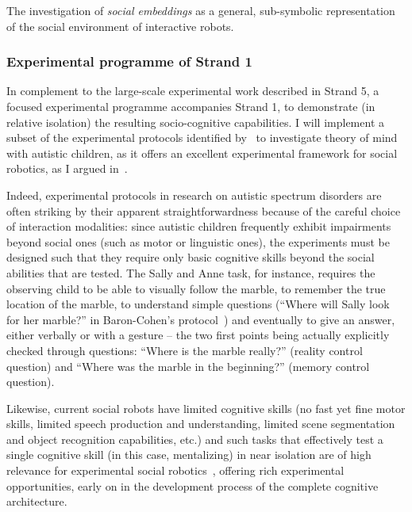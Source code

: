 \begin{outcome}{1.3}
The investigation of \emph{social
    embeddings} as a general, sub-symbolic representation of the social
    environment of interactive robots.
\end{outcome}

\subsubsection{Experimental programme of Strand 1}

In complement to the large-scale experimental work described in Strand 5, a focused experimental programme accompanies Strand 1, to demonstrate (in relative
isolation) the resulting socio-cognitive capabilities. I will implement a subset
of the experimental protocols identified by~\textcite{frith1994autism} to investigate theory of mind with autistic
children, as it offers an excellent experimental framework for social
robotics, as I argued in~\textcite{lemaignan2015mutual}.

Indeed, experimental protocols in research on autistic spectrum disorders are often
striking by their apparent straightforwardness because of the careful choice of
interaction modalities: since autistic children frequently exhibit impairments
beyond social ones (such as motor or linguistic ones), the experiments must be
designed such that they require only basic cognitive skills beyond the social
abilities that are tested. The Sally and Anne task, for instance, requires the
observing child to be able to visually follow the marble, to remember the true
location of the marble, to understand simple questions (``Where will Sally look
for her marble?'' in Baron-Cohen's protocol~\parencite{baron1985does}) and eventually
to give an answer, either verbally or with a gesture -- the two first points
being actually explicitly checked through questions: ``Where is the marble
really?'' (reality control question) and ``Where was the marble in the
beginning?'' (memory control question).

Likewise, current social robots have limited cognitive skills (no fast yet fine
motor skills, limited speech production and understanding, limited scene
segmentation and object recognition capabilities, etc.) and such tasks that
effectively test a single cognitive skill (in this case, mentalizing) in near
isolation are of high relevance for experimental social
robotics~\parencite{lemaignan2015mutual}, offering rich experimental
opportunities, early on in the development process of the complete cognitive
architecture.

